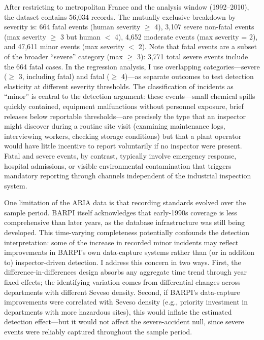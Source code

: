 \documentclass[12pt]{article}
\begin{document}
After restricting to metropolitan France and the analysis window (1992--2010), the dataset contains 56,034 records. The mutually exclusive breakdown by severity is: 664 fatal events (human severity $\geq$ 4), 3,107 severe non-fatal events (max severity $\geq$ 3 but human $<$ 4), 4,652 moderate events (max severity = 2), and 47,611 minor events (max severity $<$ 2). Note that fatal events are a subset of the broader ``severe'' category (max $\geq$ 3): 3,771 total severe events include the 664 fatal cases. In the regression analysis, I use overlapping categories---severe ($\geq$ 3, including fatal) and fatal ($\geq$ 4)---as separate outcomes to test detection elasticity at different severity thresholds. The classification of incidents as ``minor'' is central to the detection argument: these events---small chemical spills quickly contained, equipment malfunctions without personnel exposure, brief releases below reportable thresholds---are precisely the type that an inspector might discover during a routine site visit (examining maintenance logs, interviewing workers, checking storage conditions) but that a plant operator would have little incentive to report voluntarily if no inspector were present. Fatal and severe events, by contrast, typically involve emergency response, hospital admissions, or visible environmental contamination that triggers mandatory reporting through channels independent of the industrial inspection system.

One limitation of the ARIA data is that recording standards evolved over the sample period. BARPI itself acknowledges that early-1990s coverage is less comprehensive than later years, as the database infrastructure was still being developed. This time-varying completeness potentially confounds the detection interpretation: some of the increase in recorded minor incidents may reflect improvements in BARPI's own data-capture systems rather than (or in addition to) inspector-driven detection. I address this concern in two ways. First, the difference-in-differences design absorbs any aggregate time trend through year fixed effects; the identifying variation comes from differential changes across departments with different Seveso density. Second, if BARPI's data-capture improvements were correlated with Seveso density (e.g., priority investment in departments with more hazardous sites), this would inflate the estimated detection effect---but it would not affect the severe-accident null, since severe events were reliably captured throughout the sample period.
\end{document}
